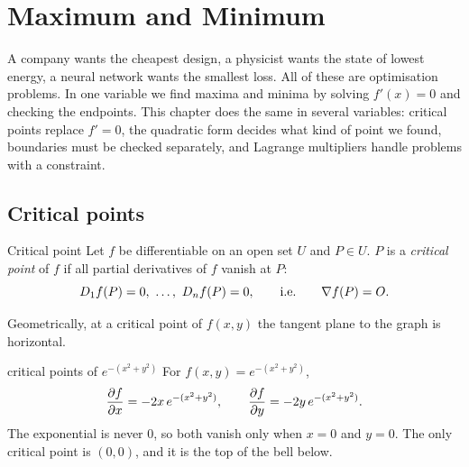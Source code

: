 \clearpage
{}\renewcommand{\tabname}{IV}
\chapter{Maximum and Minimum}\label{ch:maxmin}

A company wants the cheapest design, a physicist wants the state of lowest energy, a
neural network wants the smallest loss. All of these are optimisation problems. In one
variable we find maxima and minima by solving $f'(x)=0$ and checking the endpoints. This
chapter does the same in several variables: critical points replace $f'=0$, the quadratic
form decides what kind of point we found, boundaries must be checked separately, and
Lagrange multipliers handle problems with a constraint.

\section{Critical points}

\begin{definition}{Critical point}
Let $f$ be differentiable on an open set $U$ and $P\in U$. $P$ is a \emph{critical point} of
$f$ if all partial derivatives of $f$ vanish at $P$:
\[ D_1f(P)=0,\ \dots,\ D_nf(P)=0,\qquad\text{i.e.}\qquad \grad f(P)=O . \]
\end{definition}

Geometrically, at a critical point of $f(x,y)$ the tangent plane to the graph is horizontal.

\begin{example}{critical points of $e^{-(x^2+y^2)}$}
For $f(x,y)=e^{-(x^2+y^2)}$,
\[ \frac{\partial f}{\partial x}=-2x\,e^{-(x^2+y^2)},\qquad \frac{\partial f}{\partial y}=-2y\,e^{-(x^2+y^2)} . \]
The exponential is never $0$, so both vanish only when $x=0$ and $y=0$. The only critical
point is $(0,0)$, and it is the top of the bell below.
\end{example}

\begin{center}
\end{center}

